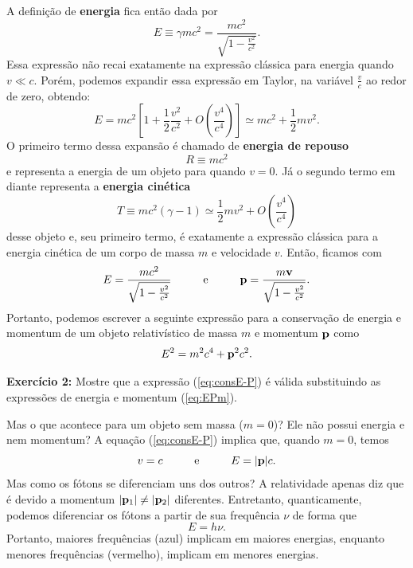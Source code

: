 \documentclass[12pt,a4paper,titlepage,brazil]{article}
\begin{document}
A definição de {\bf energia} fica então dada por
\begin{equation}
 E \equiv \gamma m c^2 = \frac{m c^2}{\sqrt{1 - \frac{v^2}{c^2}}}.
\end{equation}
Essa expressão não recai exatamente na expressão clássica para energia quando $v \ll c$. Porém, podemos expandir essa expressão em Taylor, na variável $\frac{v}{c}$ ao redor de zero, obtendo:
\begin{equation}
 E = m c^2 \left[1 + \frac{1}{2} \frac{v^2}{c^2} + O\left(\frac{v^4}{c^4}\right)\right] \simeq m c^2 + \frac{1}{2} m v^2 .
\end{equation}
O primeiro termo dessa expansão é chamado de {\bf energia de repouso}
\begin{equation}
  R \equiv m c^2 
\end{equation}  
e representa a energia de um objeto para quando $v = 0$. Já o segundo termo em diante representa a {\bf energia cinética}
\begin{equation}
 T \equiv m c^2 (\gamma - 1) \simeq \frac{1}{2} m v^2 + O\left(\frac{v^4}{c^4}\right)
\end{equation}
desse objeto e, seu primeiro termo, é exatamente a expressão clássica para a energia cinética de um corpo de massa $m$ e velocidade $v$.
Então, ficamos com
\begin{equation}
 E = \frac{m c^2}{\sqrt{1 - \frac{v^2}{c^2}}} \hspace{1cm}\textnormal{e}\hspace{1cm} {\bf p} = \frac{m {\bf v}}{\sqrt{1 - \frac{v^2}{c^2}}}. \label{eq:EPm}
\end{equation}  
Portanto, podemos escrever a seguinte expressão para a conservação de energia e momentum de um objeto relativístico de massa $m$ e momentum ${\bf p}$ como
\begin{equation}
 E^2 = m^2 c^4 + {\bf p}^2 c^2 . \label{eq:consE-P}
\end{equation}

\begin{tcolorbox}
 {\bf Exercício 2:} Mostre que a expressão (\ref{eq:consE-P}) é válida substituindo as expressões de energia e momentum (\ref{eq:EPm}).
\end{tcolorbox}

Mas o que acontece para um objeto sem massa ($m = 0$)? Ele não possui energia e nem momentum? A equação (\ref{eq:consE-P}) implica que, quando $m = 0$, temos
\begin{equation}
 v = c \hspace{1cm}\textnormal{e}\hspace{1cm} E = |{\bf p}| c .
\end{equation}  
Mas como os fótons se diferenciam uns dos outros? A relatividade apenas diz que é devido a momentum $|{\bf p}_1| \neq |{\bf p}_2|$ diferentes. Entretanto, quanticamente, podemos diferenciar os fótons a partir de sua frequência $\nu$ de forma que
\begin{equation}
 E = h \nu .
\end{equation}  
Portanto, maiores frequências (azul) implicam em maiores energias, enquanto menores frequências (vermelho), implicam em menores energias.
\end{document}

